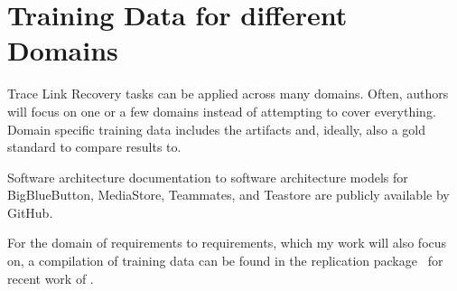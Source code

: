 \section{Training Data for different Domains}
Trace Link Recovery tasks can be applied across many domains.
Often, authors will focus on one or a few domains instead of attempting to cover everything.
Domain specific training data includes the artifacts and, ideally, also a gold standard to compare results to.


Software architecture documentation to software architecture models for BigBlueButton, MediaStore, Teammates, and Teastore are publicly available by  GitHub.

For the domain of requirements to requirements, which my work will also focus on, a compilation of training data can be found in the replication package~\cite{hey2025ReplicationPackage} for recent work of \citeauthor{hey2025RequirementsTraceability}.